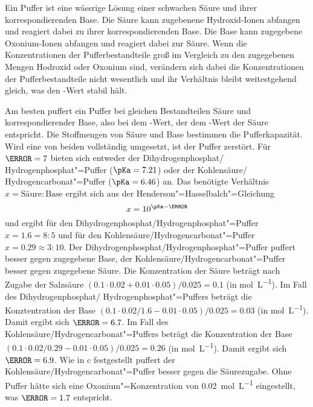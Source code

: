 \documentclass[DIV11]{scrartcl}
\begin{document}
\begin{solution}
  \begin{tasks}
    \task Ein Puffer ist eine wässrige Lösung einer schwachen Säure und ihrer
      korrespondierenden Base.  Die Säure kann zugebenene Hydroxid-Ionen
      abfangen und reagiert dabei zu ihrer korrespondierenden Base.  Die Base
      kann zugegebene Oxonium-Ionen abfangen und reagiert dabei zur Säure.
      Wenn die Konzentrationen der Pufferbestandteile groß im Vergleich zu den
      zugegebenen Mengen Hodroxid oder Oxonium sind, verändern sich dabei die
      Konzentrationen der Pufferbestandteile nicht wesentlich und ihr
      Verhältnis bleibt weitestgehend gleich, was den \pH-Wert stabil hält.

      Am besten puffert ein Puffer bei gleichen Bestandteilen Säure und
      korrespondierender Base, also bei dem \pH-Wert, der dem \pKa-Wert der
      Säure entspricht.  Die Stoffmengen von Säure und Base bestimmen die
      Pufferkapazität.  Wird eine von beiden vollständig umgesetzt, ist der
      Puffer zerstört.
    \task Für $\pH=7$ bieten sich entweder der Dihydrogenphosphat\slash
      Hydrogenphosphat"=Puffer ($\pKa=7.21$) oder der Kohlensäure\slash
      Hydrogencarbonat"=Puffer ($\pKa=6.46$) an.  Das benötigte Verhältnis
      $x=\text{Säure} : \text{Base}$ ergibt sich aus der
      Henderson"=Hasselbalch"=Gleichung
      \[
        x = 10^{\pKa-\pH}
      \]
      und ergibt für den Dihydrogenphosphat\slash Hydrogenphosphat"=Puffer $x
      = 1.6 = 8:5$ und für den Kohlensäure\slash Hydrogencarbonat"=Puffer $x =
      0.29 \approx 3:10$.
    \task Der Dihydrogenphosphat\slash Hydrogenphosphat"=Puffer puffert besser
      gegen zugegebene Base, der Kohlensäure\slash Hydrogencarbonat"=Puffer
      besser gegen zugegebene Säure.
    \task Die Konzentration der Säure beträgt nach Zugabe der Salzsäure
      $(0.1\cdot0.02 + 0.01\cdot0.05)/0.025 = 0.1$ (in
      \si{\mole\per\liter}). Im Fall des Dihydrogenphosphat\slash
      Hydrogenphosphat"=Puffers beträgt die Konztentration der Base
      $(0.1\cdot0.02/1.6 - 0.01\cdot0.05)/0.025 = 0.03$ (in
      \si{\mole\per\liter}).  Damit ergibt sich $\pH = 6.7$.  Im Fall des
      Kohlensäure\slash Hydrogencarbonat"=Puffers beträgt die Konzentration
      der Base $(0.1\cdot0.02/0.29 - 0.01\cdot0.05)/0.025 = 0.26$ (in
      \si{\mole\per\liter}).  Damit ergibt sich $\pH = 6.9$.  Wie in c
      festgestellt puffert der Kohlensäure\slash Hydrogencarbonat"=Puffer
      besser gegen die Säurezugabe.
    \task Ohne Puffer hätte sich eine Oxonium"=Konzentration von
      \SI{0.02}{\mole\per\liter} eingestellt, was $\pH = 1.7$ entspricht.
  \end{tasks}
\end{solution}
\end{document}
